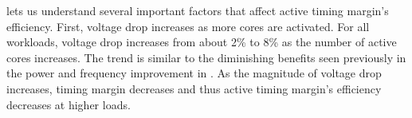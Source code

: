  lets us understand several important factors that affect active timing margin's efficiency. First, voltage drop increases as more cores are activated. For all workloads, voltage drop increases from about 2\% to 8\% as the number of active cores increases. The trend is similar to the diminishing benefits seen previously in the power and frequency improvement in . As the magnitude of voltage drop increases, timing margin decreases and thus active timing margin's efficiency decreases at higher loads. 

\begin{figure}[t]
      \hspace*{-.1in}
      \hspace*{-.1in}
      \hspace*{-.1in}
     \hspace*{-.1in}

\end{figure}

